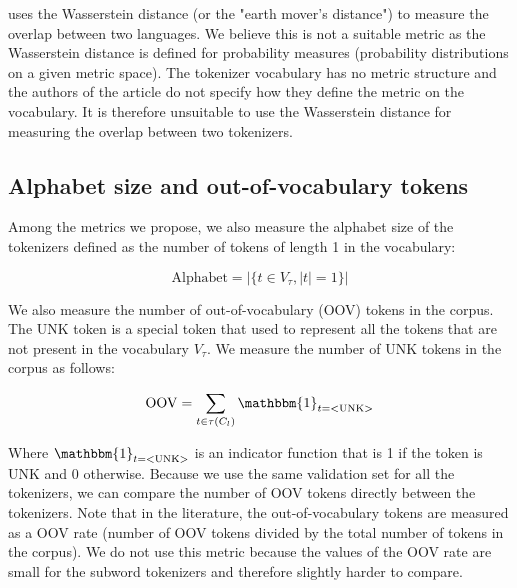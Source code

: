 \citet{chung_improving_2020} uses the Wasserstein distance (or the "earth mover's distance") to measure the overlap between two languages. We believe this is not a suitable metric as the Wasserstein distance is defined for probability measures (probability distributions on a given metric space). The tokenizer vocabulary has no metric structure and the authors of the article do not specify how they define the metric on the vocabulary. It is therefore unsuitable to use the Wasserstein distance for measuring the overlap between two tokenizers.

\subsection{Alphabet size and out-of-vocabulary tokens}

Among the metrics we propose, we also measure the alphabet size of the tokenizers defined as the number of tokens of length 1 in the vocabulary:

\begin{equation}
    \mathrm{Alphabet} = |\{t \in V_\tau, |t| = 1\}|
\end{equation}

We also measure the number of out-of-vocabulary (OOV) tokens in the corpus. The UNK token is a special token that used to represent all the tokens that are not present in the vocabulary $V_\tau$. We measure the number of UNK tokens in the corpus as follows:

\begin{equation}
    \mathrm{OOV} = \sum_{t \in \tau(C_l)} \mathbbm{1}_{t = \mathrm{<UNK>}}
\end{equation}

Where $\mathbbm{1}_{t = \mathrm{<UNK>}}$ is an indicator function that is 1 if the token is UNK and 0 otherwise. Because we use the same validation set for all the tokenizers, we can compare the number of OOV tokens directly between the tokenizers. Note that in the literature, the out-of-vocabulary tokens are measured as a OOV rate (number of OOV tokens divided by the total number of tokens in the corpus). We do not use this metric because the values of the OOV rate are small for the subword tokenizers and therefore slightly harder to compare.


